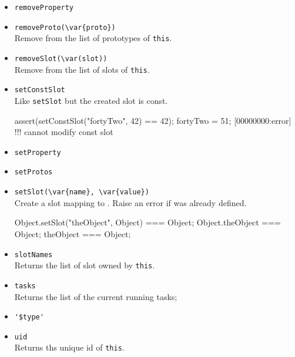 \begin{itemize}
\item \lstinline|removeProperty|\\

\item \lstinline|removeProto(\var{proto})|\\
  Remove  from the list of prototypes of \lstinline|this|.

\item \lstinline|removeSlot(\var(slot))|\\
  Remove  from the list of slots of \lstinline|this|.

\item \lstinline|setConstSlot|\\
  Like \lstinline|setSlot| but the created slot is const.

\begin{urbiscript}[firstnumber=last]
assert(setConstSlot("fortyTwo", 42) == 42);
fortyTwo = 51;
[00000000:error] !!! cannot modify const slot
\end{urbiscript}

\item \lstinline|setProperty|\\

\item \lstinline|setProtos|\\

\item \lstinline|setSlot(\var{name}, \var{value})|\\
  Create a slot  mapping to . Raise an error if
   was already defined.

\begin{urbiassert}[firstnumber=last]
Object.setSlot("theObject", Object) === Object;
Object.theObject === Object;
theObject === Object;
\end{urbiassert}

\item \lstinline|slotNames|\\
  Returns the list of slot owned by \lstinline|this|.

\item \lstinline|tasks|\\
  Returns the list of the current running tasks;

\item \lstinline|'$type'|\\ %

\item \lstinline|uid|\\
  Returns ths unique id of \lstinline|this|.


\end{itemize}
